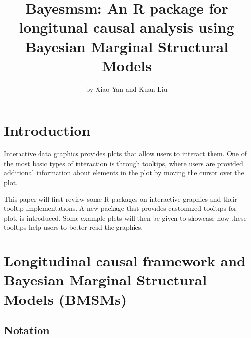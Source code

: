 \title{Bayesmsm: An R package for longitunal causal analysis using Bayesian Marginal Structural Models}


\author{by Xiao Yan and Kuan Liu}

\maketitle


\section{Introduction}\label{introduction}

Interactive data graphics provides plots that allow users to interact
them. One of the most basic types of interaction is through tooltips,
where users are provided additional information about elements in the
plot by moving the cursor over the plot.

This paper will first review some R packages on interactive graphics and
their tooltip implementations. A new package  that
provides customized tooltips for plot, is introduced. Some example plots
will then be given to showcase how these tooltips help users to better
read the graphics.

\section{Longitudinal causal framework and Bayesian Marginal Structural Models (BMSMs)}\label{longitudinal-causal-framework-and-bayesian-marginal-structural-models-bmsms}

\subsection{Notation}\label{notation}


